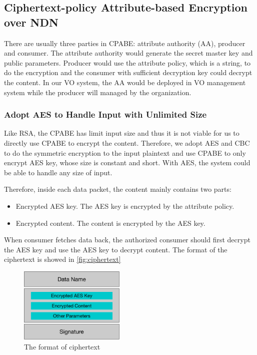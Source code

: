 \subsection{Ciphertext-policy Attribute-based Encryption over NDN}

There are usually three parties in CPABE: attribute authority (AA), producer and consumer.
The attribute authority would generate the secret master key and public parameters.
Producer would use the attribute policy, which is a string, to do the encryption and the consumer with sufficient decryption key could decrypt the content.
In our VO system, the AA would be deployed in VO management system while the producer will managed by the organization.

\subsubsection{Adopt AES to Handle Input with Unlimited Size}
Like RSA, the CPABE has limit input size and thus it is not viable for us to directly use CPABE to encrypt the content.
Therefore, we adopt AES and CBC to do the symmetric encryption to the input plaintext and use CPABE to only encrypt AES key, whose size is constant and short.
With AES, the system could be able to handle any size of input.

Therefore, inside each data packet, the content mainly contains two parts:
\begin{itemize}
\item Encrypted AES key. The AES key is encrypted by the attribute policy.
\item Encrypted content. The content is encrypted by the AES key.
\end{itemize}
When consumer fetches data back, the authorized consumer should first decrypt the AES key and use the AES key to decrypt content.
The format of the ciphertext is showed in \ref{fig:ciphertext}

\begin{figure}[h]
  \centering
  \includegraphics[width=0.45\textwidth]{figures/ciphertext}
  \vspace{-3mm}
  \caption{The format of ciphertext}
  \label{fig:token}
\end{figure}

